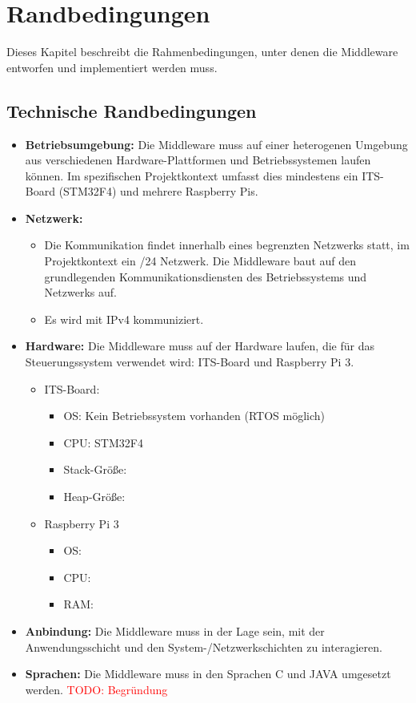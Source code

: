 

\chapter{Randbedingungen}

Dieses Kapitel beschreibt die Rahmenbedingungen, unter denen die Middleware entworfen und implementiert werden muss.

\section{Technische Randbedingungen}


\begin{itemize}
    \item \textbf{Betriebsumgebung:}  Die Middleware muss auf einer heterogenen Umgebung aus verschiedenen Hardware-Plattformen und Betriebssystemen laufen können. Im spezifischen Projektkontext umfasst dies mindestens ein ITS-Board (STM32F4) und mehrere Raspberry Pis.
    
    \item \textbf{Netzwerk:}  
    \begin{itemize}
        \item Die Kommunikation findet innerhalb eines begrenzten Netzwerks statt, im Projektkontext ein /24 Netzwerk. Die Middleware baut auf den grundlegenden Kommunikationsdiensten des Betriebssystems und Netzwerks auf.
        \item Es wird mit IPv4 kommuniziert.
    \end{itemize}
    \item \textbf{Hardware:} Die Middleware muss auf der Hardware laufen, die für das Steuerungssystem verwendet wird: ITS-Board und Raspberry Pi 3. 
    \begin{itemize}
    	\item ITS-Board: 
    	\begin{itemize}
    		\item OS: Kein Betriebssystem vorhanden (RTOS möglich)
    		\item CPU: STM32F4
    		\item Stack-Größe:
    		\item Heap-Größe:
    		
    	\end{itemize}
    	\item Raspberry Pi 3
    	\begin{itemize}
    		\item OS:
    		\item CPU: 
    		\item RAM:
    		
    	\end{itemize}
    \end{itemize}
    \item \textbf{Anbindung:} Die Middleware muss in der Lage sein, mit der Anwendungsschicht und den System-/Netzwerkschichten zu interagieren.
    \item \textbf{Sprachen:} Die Middleware muss in den Sprachen C und JAVA umgesetzt werden. \textcolor{red}{TODO: Begründung}

    
\end{itemize}
